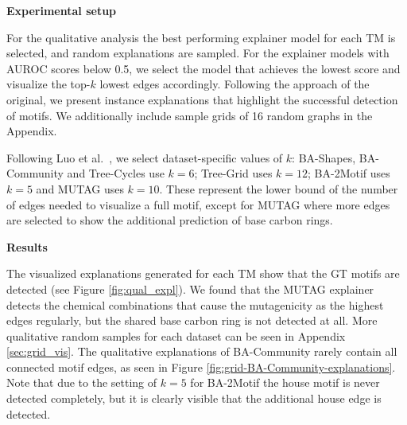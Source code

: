 \textbf{Experimental setup}\par
For the qualitative analysis the best performing explainer model for each \ac{TM} is selected, and random explanations are sampled. For the explainer models with AUROC scores below 0.5, we select the model that achieves the lowest score and visualize the top-$k$ lowest edges accordingly. Following the approach of the original, we present instance explanations that highlight the successful detection of motifs. We additionally include sample grids of 16 random graphs in the Appendix.

Following Luo et al.~\cite{luo2020parameterized}, we select dataset-specific values of $k$: BA-Shapes, BA-Community and Tree-Cycles use $k=6$; Tree-Grid uses $k=12$; BA-2Motif uses $k=5$ and MUTAG uses $k=10$. These represent the lower bound of the number of edges needed to visualize a full motif, except for MUTAG where more edges are selected to show the additional prediction of base carbon rings. \bigskip

\textbf{Results}\par
The visualized explanations generated for each \ac{TM} show that the \ac{GT} motifs are detected (see Figure \ref{fig:qual_expl}).
We found that the MUTAG explainer detects the chemical combinations that cause the mutagenicity as the highest edges regularly, but the shared base carbon ring is not detected at all. More qualitative random samples for each dataset can be seen in Appendix \ref{sec:grid_vis}. The qualitative explanations of BA-Community rarely contain all connected motif edges, as seen in Figure \ref{fig:grid-BA-Community-explanations}. Note that due to the setting of $k=5$ for BA-2Motif the house motif is never detected completely, but it is clearly visible that the additional house edge is detected.

